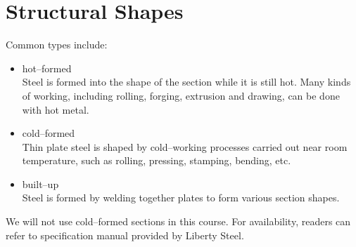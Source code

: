 \section{Structural Shapes}
Common types include:
\begin{itemize}
\item hot--formed\\Steel is formed into the shape of the section while it is still hot.
Many kinds of working, including rolling, forging, extrusion and drawing, can be done with hot metal.
\item cold--formed\\Thin plate steel is shaped by cold--working processes carried out near room temperature, such as rolling, pressing, stamping, bending, etc.
\item built--up\\Steel is formed by welding together plates to form various section shapes.
\end{itemize}
We will not use cold--formed sections in this course.
For availability, readers can refer to specification manual provided by Liberty Steel.
